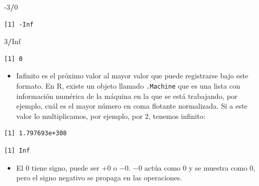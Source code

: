 \documentclass[]{book}
\newenvironment{Shaded}{\begin{snugshade}}{\end{snugshade}}
\newcommand{\DecValTok}[1]{\textcolor[rgb]{0.00,0.00,0.81}{#1}}
\newcommand{\NormalTok}[1]{#1}
\newcommand{\OperatorTok}[1]{\textcolor[rgb]{0.81,0.36,0.00}{\textbf{#1}}}
\newcommand{\OtherTok}[1]{\textcolor[rgb]{0.56,0.35,0.01}{#1}}
\newcommand{\StringTok}[1]{\textcolor[rgb]{0.31,0.60,0.02}{#1}}
\providecommand{\tightlist}{%
  \setlength{\itemsep}{0pt}\setlength{\parskip}{0pt}}
\begin{document}
\begin{Shaded}
\begin{Highlighting}[]
\DecValTok{-3}\OperatorTok{/}\DecValTok{0}
\end{Highlighting}
\end{Shaded}

\begin{verbatim}
[1] -Inf
\end{verbatim}

\begin{Shaded}
\begin{Highlighting}[]
\DecValTok{3}\OperatorTok{/}\OtherTok{Inf}
\end{Highlighting}
\end{Shaded}

\begin{verbatim}
[1] 0
\end{verbatim}

\begin{itemize}
\tightlist
\item
  Infinito es el próximo valor al mayor valor que puede registrarse bajo este formato. En R, existe un objeto llamado \texttt{.Machine} que es una lista con información numérica de la máquina en la que se está trabajando, por ejemplo, cuál es el mayor número en coma flotante normalizada. Si a este valor lo multiplicamos, por ejemplo, por 2, tenemos infinito:
\end{itemize}

\begin{Shaded}
\end{Shaded}

\begin{verbatim}
[1] 1.797693e+308
\end{verbatim}

\begin{Shaded}
\end{Shaded}

\begin{verbatim}
[1] Inf
\end{verbatim}

\begin{itemize}
\tightlist
\item
  El 0 tiene signo, puede ser \(+0\) o \(-0\). \(-0\) actúa como \(0\) y se muestra como \(0\), pero el signo negativo se propaga en las operaciones.
\end{itemize}
\end{document}
